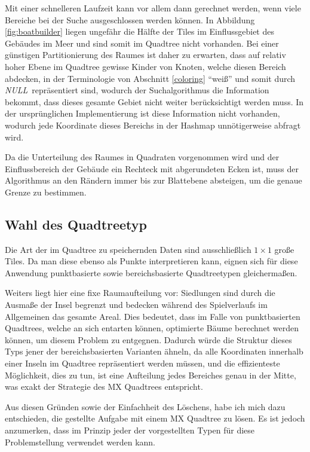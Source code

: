 \documentclass[%
			paper=a4,%
			DIV12,
			liststotoc,
			bibtotoc,
			draft=false,%
			titlepage,
			numbers=noendperiod
			]{scrartcl}
\newcommand{\mynull}{\textit{NULL}}
\begin{document}
Mit einer schnelleren Laufzeit kann vor allem dann gerechnet werden, wenn viele Bereiche bei der Suche ausgeschlossen werden können.
In Abbildung \ref{fig:boatbuilder} liegen ungefähr die Hälfte der Tiles im Einflussgebiet des Gebäudes im Meer und sind somit im Quadtree nicht vorhanden.
Bei einer günstigen Partitionierung des Raumes ist daher zu erwarten, dass auf relativ hoher Ebene im Quadtree gewisse Kinder von Knoten, welche diesen Bereich abdecken, in der Terminologie von Abschnitt \ref{coloring} "`weiß"' und somit durch \mynull\ repräsentiert sind, wodurch der Suchalgorithmus die Information bekommt, dass dieses gesamte Gebiet nicht weiter berücksichtigt werden muss.
In der ursprünglichen Implementierung ist diese Information nicht vorhanden, wodurch jede Koordinate dieses Bereichs in der Hashmap unnötigerweise abfragt wird.

Da die Unterteilung des Raumes in Quadraten vorgenommen wird und der Einflussbereich der Gebäude ein Rechteck mit abgerundeten Ecken ist, 
muss der Algorithmus an den Rändern immer bis zur Blattebene absteigen, um die genaue Grenze zu bestimmen.

\subsection{Wahl des Quadtreetyp}

Die Art der im Quadtree zu speichernden Daten sind ausschließlich $1\times1$ große Tiles. Da man diese ebenso als Punkte interpretieren kann, eignen sich für diese Anwendung punktbasierte sowie bereichsbasierte Quadtreetypen gleichermaßen.

Weiters liegt hier eine fixe Raumaufteilung vor:
Siedlungen sind durch die Ausmaße der Insel begrenzt und bedecken während des Spielverlaufs im Allgemeinen das gesamte Areal.
Dies bedeutet, dass im Falle von punktbasierten Quadtrees, welche an sich entarten können, optimierte Bäume berechnet werden können, um diesem Problem zu entgegnen.
Dadurch würde die Struktur dieses Typs jener der bereichsbasierten Varianten ähneln, da alle Koordinaten innerhalb einer Inseln im Quadtree repräsentiert werden müssen, und die effizienteste Möglichkeit, dies zu tun, ist eine Aufteilung jedes Bereiches genau in der Mitte, was exakt der Strategie des MX Quadtrees entspricht.

Aus diesen Gründen sowie der Einfachheit des Löschens, habe ich mich dazu entschieden, die gestellte Aufgabe mit einem MX Quadtree zu lösen.
Es ist jedoch anzumerken, dass im Prinzip jeder der vorgestellten Typen für diese Problemstellung verwendet werden kann.
\end{document}
